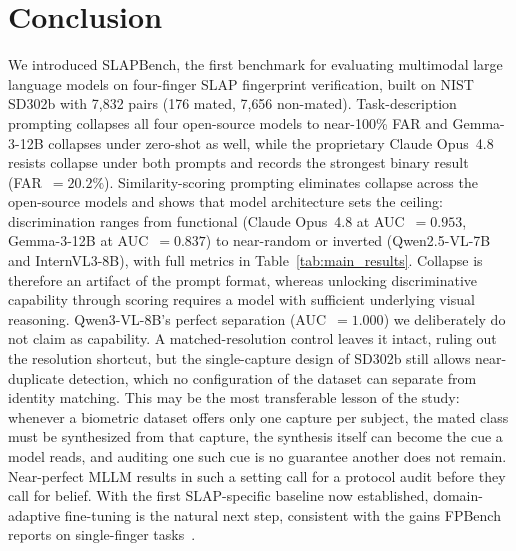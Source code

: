 \documentclass[runningheads]{llncs}
\begin{document}
\section{Conclusion}
\label{sec:conclusion}

We introduced SLAPBench, the first benchmark for evaluating multimodal
large language models on four-finger SLAP fingerprint verification, built
on NIST SD302b with 7,832 pairs (176 mated, 7,656 non-mated).
Task-description prompting collapses all four open-source models to
near-100\% FAR and Gemma-3-12B collapses under zero-shot as well, while the
proprietary Claude Opus~4.8 resists collapse under both prompts and records
the strongest binary result (FAR~$= 20.2\%$).
Similarity-scoring prompting eliminates collapse across the open-source
models and shows that model architecture sets the ceiling: discrimination
ranges from functional (Claude Opus~4.8 at AUC~$= 0.953$, Gemma-3-12B at
AUC~$= 0.837$) to near-random or inverted (Qwen2.5-VL-7B and InternVL3-8B),
with full metrics in Table~\ref{tab:main_results}.
Collapse is therefore an artifact of the prompt format, whereas unlocking
discriminative capability through scoring requires a model with sufficient
underlying visual reasoning.
Qwen3-VL-8B's perfect separation (AUC~$= 1.000$) we deliberately do not claim
as capability. A matched-resolution control leaves it intact, ruling out the
resolution shortcut, but the single-capture design of SD302b still allows
near-duplicate detection, which no configuration of the dataset can separate
from identity matching. This may be the most transferable lesson of the study:
whenever a biometric dataset offers only one capture per subject, the mated
class must be synthesized from that capture, the synthesis itself can become
the cue a model reads, and auditing one such cue is no guarantee another does
not remain. Near-perfect MLLM results in such a setting call for a protocol
audit before they call for belief.
With the first SLAP-specific baseline now established, domain-adaptive
fine-tuning is the natural next step, consistent with the gains FPBench
reports on single-finger tasks~\cite{fpbench2025}.



\end{document}
